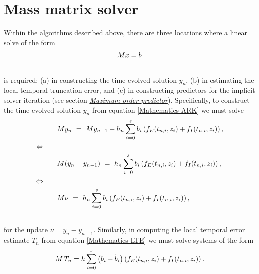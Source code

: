 \documentclass[letterpaper,10pt,english]{sphinxmanual}
\begin{document}
\section{Mass matrix solver}
\label{Mathematics:mass-matrix-solver}\label{Mathematics:mathematics-masssolve}
Within the algorithms described above, there are three locations where a
linear solve of the form
\begin{gather}
\begin{split}M x = b\end{split}\notag\\\begin{split}\end{split}\notag
\end{gather}
is required: (a) in constructing the time-evolved solution
$y_n$, (b) in estimating the local temporal truncation error,
and (c) in constructing predictors for the implicit solver iteration
(see section {\hyperref[Mathematics:mathematics-predictors-max]{\emph{Maximum order predictor}}}).  Specifically, to
construct the time-evolved solution $y_n$ from equation
\eqref{Mathematics-ARK} we must solve
\begin{gather}
\begin{split}&M y_n \ = \ M y_{n-1} + h_n \sum_{i=0}^{s} b_i \left(f_E(t_{n,i}, z_i)
              + f_I(t_{n,i}, z_i)\right), \\
\Leftrightarrow \qquad & \\
&M (y_n -y_{n-1}) \ = \ h_n \sum_{i=0}^{s} b_i \left(f_E(t_{n,i}, z_i)
              + f_I(t_{n,i}, z_i)\right), \\
\Leftrightarrow \qquad & \\
&M \nu \ = \ h_n \sum_{i=0}^{s} b_i \left(f_E(t_{n,i}, z_i)
              + f_I(t_{n,i}, z_i)\right),\end{split}\notag\\\begin{split}\end{split}\notag
\end{gather}
for the update $\nu = y_n - y_{n-1}$.  Similarly, in computing
the local temporal error estimate $T_n$ from equation \eqref{Mathematics-LTE}
we must solve systems of the form
\begin{gather}
\begin{split}M\, T_n = h \sum_{i=0}^{s} \left(b_i - \tilde{b}_i\right)
\left(f_E(t_{n,i}, z_i) + f_I(t_{n,i}, z_i)\right).\end{split}\notag\\\begin{split}\end{split}\notag
\end{gather}
\end{document}
